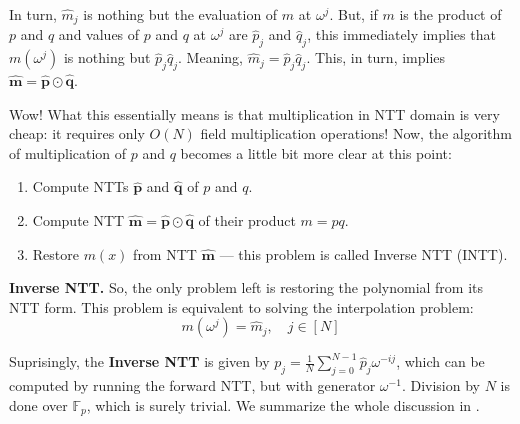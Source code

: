 \documentclass[../lecture-notes-148x210.tex]{subfiles}
\begin{document}
In turn, $\hat{m}_j$ is nothing but the evaluation of $m$ at $\omega^j$. But, if $m$ is the product of $p$ and $q$
and values of $p$ and $q$ at $\omega^j$ are $\hat{p}_j$ and $\hat{q}_j$, this immediately implies that 
$m(\omega^j)$ is nothing but $\hat{p}_j\hat{q}_j$. Meaning, $\hat{m}_j = \hat{p}_j\hat{q}_j$. This, in turn,
implies $\hat{\boldsymbol{m}} = \hat{\boldsymbol{p}} \odot \hat{\boldsymbol{q}}$.

Wow! What this essentially means is that multiplication in NTT domain is very cheap:
it requires only $O(N)$ field multiplication operations! Now, the algorithm 
of multiplication of $p$ and $q$ becomes a little bit more clear at this point:
\begin{enumerate}
    \item Compute NTTs $\hat{\boldsymbol{p}}$ and $\hat{\boldsymbol{q}}$ of $p$ and $q$.
    \item Compute NTT $\hat{\boldsymbol{m}} = \hat{\boldsymbol{p}} \odot \hat{\boldsymbol{q}}$ of their product $m = pq$.
    \item Restore $m(x)$ from NTT $\hat{\boldsymbol{m}}$ --- this problem is called Inverse NTT (INTT).
\end{enumerate}

\textcolor{green!60!black}{\textbf{Inverse NTT.}} So, the only problem left is restoring the polynomial from 
its NTT form. This problem is equivalent to solving the interpolation problem:
\begin{equation*}
    m(\omega^j) = \hat{m}_j, \quad j \in [N]
\end{equation*}

Suprisingly, the \textbf{Inverse NTT} is given by $p_j =
\frac{1}{N}\sum_{j=0}^{N-1}\hat{p}_j\omega^{-ij}$, which can be computed by
running the forward NTT, but with generator $\omega^{-1}$. Division by $N$ is
done over $\mathbb{F}_p$, which is surely trivial. We summarize the whole
discussion in .
\end{document}
